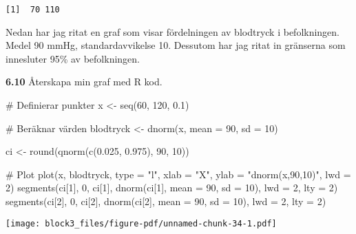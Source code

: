 \documentclass[
  letterpaper,
  DIV=11,
  numbers=noendperiod]{scrartcl}
\newenvironment{Shaded}{\begin{snugshade}}{\end{snugshade}}
\newcommand{\AttributeTok}[1]{\textcolor[rgb]{0.40,0.45,0.13}{#1}}
\newcommand{\CommentTok}[1]{\textcolor[rgb]{0.37,0.37,0.37}{#1}}
\newcommand{\DecValTok}[1]{\textcolor[rgb]{0.68,0.00,0.00}{#1}}
\newcommand{\FloatTok}[1]{\textcolor[rgb]{0.68,0.00,0.00}{#1}}
\newcommand{\FunctionTok}[1]{\textcolor[rgb]{0.28,0.35,0.67}{#1}}
\newcommand{\NormalTok}[1]{\textcolor[rgb]{0.00,0.23,0.31}{#1}}
\newcommand{\OtherTok}[1]{\textcolor[rgb]{0.00,0.23,0.31}{#1}}
\newcommand{\StringTok}[1]{\textcolor[rgb]{0.13,0.47,0.30}{#1}}
\begin{document}
\begin{verbatim}
[1]  70 110
\end{verbatim}

Nedan har jag ritat en graf som visar fördelningen av blodtryck i
befolkningen. Medel 90 mmHg, standardavvikelse 10. Dessutom har jag
ritat in gränserna som innesluter 95\% av befolkningen.

\textbf{6.10} Återskapa min graf med R kod.

\begin{Shaded}
\begin{Highlighting}[]
\CommentTok{\# Definierar punkter}
\NormalTok{x }\OtherTok{\textless{}{-}} \FunctionTok{seq}\NormalTok{(}\DecValTok{60}\NormalTok{, }\DecValTok{120}\NormalTok{, }\FloatTok{0.1}\NormalTok{)}

\CommentTok{\# Beräknar värden}
\NormalTok{blodtryck }\OtherTok{\textless{}{-}} \FunctionTok{dnorm}\NormalTok{(x, }\AttributeTok{mean =} \DecValTok{90}\NormalTok{, }\AttributeTok{sd =} \DecValTok{10}\NormalTok{)}

\NormalTok{ci }\OtherTok{\textless{}{-}} \FunctionTok{round}\NormalTok{(}\FunctionTok{qnorm}\NormalTok{(}\FunctionTok{c}\NormalTok{(}\FloatTok{0.025}\NormalTok{, }\FloatTok{0.975}\NormalTok{), }\DecValTok{90}\NormalTok{, }\DecValTok{10}\NormalTok{))}

\CommentTok{\# Plot}
\FunctionTok{plot}\NormalTok{(x, blodtryck, }\AttributeTok{type =} \StringTok{"l"}\NormalTok{, }\AttributeTok{xlab =} \StringTok{"X"}\NormalTok{, }\AttributeTok{ylab =} \StringTok{"dnorm(x,90,10)"}\NormalTok{, }\AttributeTok{lwd =} \DecValTok{2}\NormalTok{)}
\FunctionTok{segments}\NormalTok{(ci[}\DecValTok{1}\NormalTok{], }\DecValTok{0}\NormalTok{, ci[}\DecValTok{1}\NormalTok{], }\FunctionTok{dnorm}\NormalTok{(ci[}\DecValTok{1}\NormalTok{], }\AttributeTok{mean =} \DecValTok{90}\NormalTok{, }\AttributeTok{sd =} \DecValTok{10}\NormalTok{), }\AttributeTok{lwd =} \DecValTok{2}\NormalTok{, }\AttributeTok{lty =} \DecValTok{2}\NormalTok{)}
\FunctionTok{segments}\NormalTok{(ci[}\DecValTok{2}\NormalTok{], }\DecValTok{0}\NormalTok{, ci[}\DecValTok{2}\NormalTok{], }\FunctionTok{dnorm}\NormalTok{(ci[}\DecValTok{2}\NormalTok{], }\AttributeTok{mean =} \DecValTok{90}\NormalTok{, }\AttributeTok{sd =} \DecValTok{10}\NormalTok{), }\AttributeTok{lwd =} \DecValTok{2}\NormalTok{, }\AttributeTok{lty =} \DecValTok{2}\NormalTok{)}
\end{Highlighting}
\end{Shaded}

\texttt{[image: block3\_files/figure-pdf/unnamed-chunk-34-1.pdf]}
\end{document}
